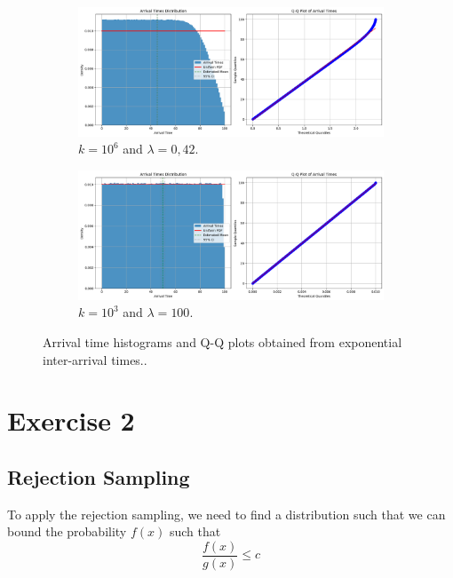 \documentclass[a4paper]{article}
\begin{document}
\begin{figure}[htbp]
  \centering
  \begin{subfigure}[b]{0.48\textwidth}
    \centering
    \includegraphics[width=\textwidth]{images/ex1-p2.png}
    \caption{$k = 10^6$ and $\lambda = 0,42$.}\label{fig:ex1-p2}
  \end{subfigure}
  \hfill
  \begin{subfigure}[b]{0.48\textwidth}
    \centering
    \includegraphics[width=\textwidth]{images/ex1-p2-hl.png}
    \caption{$k = 10^3$ and $\lambda = 100$.}\label{fig:ex1-p2-hl}
  \end{subfigure}
  \caption{Arrival time histograms and Q-Q plots obtained from exponential inter-arrival times..}\label{fig:ex1-p2-combined}
\end{figure}

\section*{Exercise 2}

\subsection*{Rejection Sampling}
To apply the rejection sampling, we need to find a distribution such that we can bound the probability $f(x)$ such that
\begin{equation*}
  \frac{f(x)}{g(x)} \leq c
\end{equation*}
\end{document}
